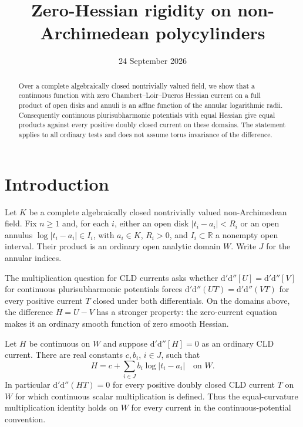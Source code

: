 \documentclass[11pt,a4paper]{amsart}
\title[Zero-Hessian rigidity on polycylinders]{Zero-Hessian rigidity on non-Archimedean polycylinders}
\author{}
\date{24 September 2026}
\begin{document}
\begin{abstract}
Over a complete algebraically closed nontrivially valued field, we show that a continuous function with zero Chambert--Loir--Ducros Hessian current on a full product of open disks and annuli is an affine function of the annular logarithmic radii. Consequently continuous plurisubharmonic potentials with equal Hessian give equal products against every positive doubly closed current on these domains. The statement applies to all ordinary tests and does not assume torus invariance of the difference.
\end{abstract}

\maketitle

\section{Introduction}

Let $K$ be a complete algebraically closed nontrivially valued non-Archimedean field. Fix $n\geq1$ and, for each $i$, either an open disk $|t_i-a_i|<R_i$ or an open annulus $\log|t_i-a_i|\in I_i$, with $a_i\in K$, $R_i>0$, and $I_i\subset\mathbb R$ a nonempty open interval. Their product is an ordinary open analytic domain $W$. Write $J$ for the annular indices.

The multiplication question for CLD currents asks whether $\mathrm d'\mathrm d''[U]=\mathrm d'\mathrm d''[V]$ for continuous plurisubharmonic potentials forces $\mathrm d'\mathrm d''(UT)=\mathrm d'\mathrm d''(VT)$ for every positive current $T$ closed under both differentials. On the domains above, the difference $H=U-V$ has a stronger property: the zero-current equation makes it an ordinary smooth function of zero smooth Hessian.

\begin{maintheorem}\label{thm:polycylinder-rigidity}
Let $H$ be continuous on $W$ and suppose $\mathrm d'\mathrm d''[H]=0$ as an ordinary CLD current. There are real constants $c,b_i$, $i\in J$, such that
\begin{equation}\label{eq:affine-form}
 H=c+\sum_{i\in J}b_i\log|t_i-a_i|\quad\text{on }W.
\end{equation}
In particular $\mathrm d'\mathrm d''(HT)=0$ for every positive doubly closed CLD current $T$ on $W$ for which continuous scalar multiplication is defined. Thus the equal-curvature multiplication identity holds on $W$ for every current in the continuous-potential convention.
\end{maintheorem}
\end{document}
